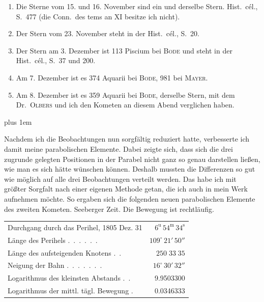 \begin{enumerate}
\item[1)] Die Sterne vom 15. und 16. November sind ein und derselbe Stern. Hist.\ cél., S.\ 477 (die Conn.\ des tems an XI besitze ich nicht).
\item[2)] Der Stern vom 23. November steht in der Hist.\ cél., S.\ 20.
\item[3)] Der Stern am 3. Dezember ist 113 Piscium bei \textsc{Bode} und steht in der Hist.\ cél., S.\ 37 und 200.
\item[4)] Am 7. Dezember ist es 374 Aquarii bei \textsc{Bode}, 981 bei \textsc{Mayer}.
\item[5)] Am 8. Dezember ist es 359 Aquarii bei \textsc{Bode}, derselbe Stern, mit dem Dr.\ \textsc{Olbers} und ich den Kometen an diesem Abend verglichen haben.
\end{enumerate}

{\rightskip=0pt plus 1em
\par\indent Nachdem ich die Beobachtungen nun sorgfältig reduziert hatte, verbesserte ich damit meine parabolischen Elemente. Dabei zeigte sich, dass sich die drei zugrunde gelegten Positionen in der Parabel nicht ganz so genau darstellen ließen, wie man es sich hätte wünschen können. Deshalb mussten die Differenzen so gut wie möglich auf alle drei Beobachtungen verteilt werden. Das habe ich mit größter Sorgfalt nach einer eigenen Methode getan, die ich auch in mein Werk aufnehmen möchte. So ergaben sich die folgenden neuen parabolischen Elemente des zweiten Kometen. Seeberger Zeit. Die Bewegung ist rechtläufig.\par}



\begin{center}\begingroup
\fontsize{9}{11}\selectfont
\setlength{\tabcolsep}{2pt}\renewcommand{\arraystretch}{1.12}
\begin{tabular}{lr}
Durchgang durch das Perihel, 1805 Dez. 31 & $6^{\mathrm{u}}\,54^{\mathrm{m}}\,34^{\mathrm{s}}$ \\
Länge des Perihels .\ .\ .\ .\ .\ . & $109^{\circ}\,21'\,50''$ \\
Länge des aufsteigenden Knotens .\ . & $250\;33\;35$ \\
Neigung der Bahn .\ .\ .\ .\ .\ .\ . & $16^{\circ}\,30'\,32''$ \\
Logarithmus des kleinsten Abstands .\ . & 9.9503300 \\
Logarithmus der mittl. tägl. Bewegung . & 0.0346333 \\
\end{tabular}\endgroup\end{center}




